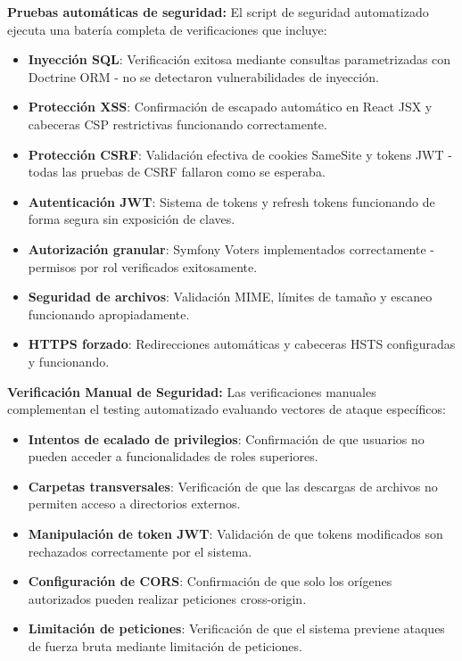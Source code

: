 \documentclass[12pt,a4paper,oneside]{report}
\begin{document}
\textbf{Pruebas automáticas de seguridad:} El script de seguridad automatizado ejecuta una batería completa de verificaciones que incluye:
\begin{itemize}
\item \textbf{Inyección SQL}: Verificación exitosa mediante consultas parametrizadas con Doctrine ORM - no se detectaron vulnerabilidades de inyección.
\item \textbf{Protección XSS}: Confirmación de escapado automático en React JSX y cabeceras CSP restrictivas funcionando correctamente.
\item \textbf{Protección CSRF}: Validación efectiva de cookies SameSite y tokens JWT - todas las pruebas de CSRF fallaron como se esperaba.
\item \textbf{Autenticación JWT}: Sistema de tokens y refresh tokens funcionando de forma segura sin exposición de claves.
\item \textbf{Autorización granular}: Symfony Voters implementados correctamente - permisos por rol verificados exitosamente.
\item \textbf{Seguridad de archivos}: Validación MIME, límites de tamaño y escaneo funcionando apropiadamente.
\item \textbf{HTTPS forzado}: Redirecciones automáticas y cabeceras HSTS configuradas y funcionando.
\end{itemize}

\textbf{Verificación Manual de Seguridad:} Las verificaciones manuales complementan el testing automatizado evaluando vectores de ataque específicos:
\begin{itemize}
\item \textbf{Intentos de ecalado de privilegios}: Confirmación de que usuarios no pueden acceder a funcionalidades de roles superiores.
\item \textbf{Carpetas transversales}: Verificación de que las descargas de archivos no permiten acceso a directorios externos.
\item \textbf{Manipulación de token JWT}: Validación de que tokens modificados son rechazados correctamente por el sistema.
\item \textbf{Configuración de CORS}: Confirmación de que solo los orígenes autorizados pueden realizar peticiones cross-origin.
\item \textbf{Limitación de peticiones}: Verificación de que el sistema previene ataques de fuerza bruta mediante limitación de peticiones.
\end{itemize}
\end{document}
